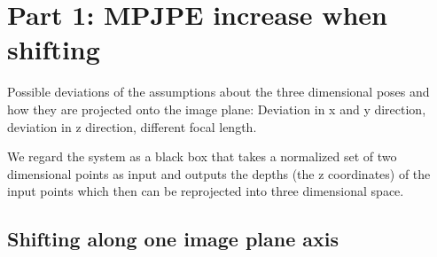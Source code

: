 \section{Part 1: MPJPE increase when shifting}

Possible deviations of the assumptions about the three dimensional poses and how they are projected onto the image plane: Deviation in x and y direction, deviation in z direction, different focal length.

We regard the system as a black box that takes a normalized set of two dimensional points as input and outputs the depths (the z coordinates) of the input points which then can be reprojected into three dimensional space.
\subsection{Shifting along one image plane axis}
\label{sec:x-shift-error}

